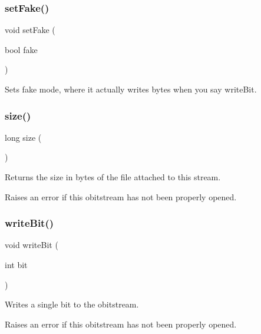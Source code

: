 \mbox{\label{classobitstream_ad916b4624eb09d375514964f867b475c}} 
\subsubsection{\texorpdfstring{set\+Fake()}{setFake()}}
{\footnotesize\ttfamily void set\+Fake (\begin{DoxyParamCaption}\item[{bool}]{fake }\end{DoxyParamCaption})}



Sets \textquotesingle{}fake\textquotesingle{} mode, where it actually writes bytes when you say write\+Bit. 

\mbox{\label{classobitstream_a22727e9c338fb1aaa6722031445373c3}} 
\subsubsection{\texorpdfstring{size()}{size()}}
{\footnotesize\ttfamily long size (\begin{DoxyParamCaption}{ }\end{DoxyParamCaption})}



Returns the size in bytes of the file attached to this stream. 

Raises an error if this obitstream has not been properly opened. \mbox{\label{classobitstream_a487c88ba2560a4657d18c3edb7d9d247}} 
\subsubsection{\texorpdfstring{write\+Bit()}{writeBit()}}
{\footnotesize\ttfamily void write\+Bit (\begin{DoxyParamCaption}\item[{int}]{bit }\end{DoxyParamCaption})}



Writes a single bit to the obitstream. 

Raises an error if this obitstream has not been properly opened. 